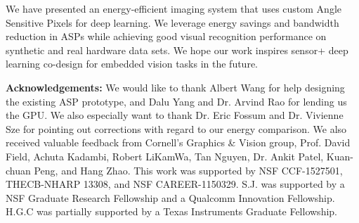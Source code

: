 \documentclass[10pt,twocolumn,letterpaper]{article}
\begin{document}
We have presented an energy-efficient imaging system that uses custom Angle Sensitive Pixels for deep learning. We leverage energy savings and bandwidth reduction in ASPs while achieving good visual recognition performance on synthetic and real hardware data sets. We hope our work inspires sensor+ deep learning co-design for embedded vision tasks in the future.

\vspace{5mm}
\noindent \textbf{Acknowledgements:} We would like to thank Albert Wang for help designing the existing ASP prototype, and Dalu Yang and Dr. Arvind Rao for lending us the GPU. We also especially want to thank Dr. Eric Fossum and Dr. Vivienne Sze for pointing out corrections with regard to our energy comparison. We also received valuable feedback from Cornell's Graphics \& Vision group, Prof. David Field, Achuta Kadambi, Robert LiKamWa, Tan Nguyen, Dr. Ankit Patel, Kuan-chuan Peng, and Hang Zhao. This work was supported by NSF CCF-1527501, THECB-NHARP 13308, and NSF CAREER-1150329. S.J. was supported by a NSF Graduate Research Fellowship and a Qualcomm Innovation Fellowship. H.G.C was partially supported by a Texas Instruments Graduate Fellowship.   



{\small


}

\end{document}

